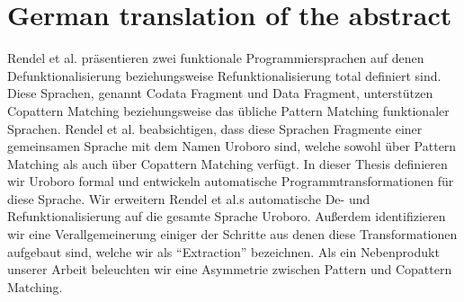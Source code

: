 \chapter{German translation of the abstract}

Rendel et al. präsentieren zwei funktionale Programmiersprachen auf denen Defunktionalisierung beziehungsweise Refunktionalisierung total definiert sind. Diese Sprachen, genannt Codata Fragment und Data Fragment, unterstützen Copattern Matching beziehungsweise das übliche Pattern Matching funktionaler Sprachen. Rendel et al. beabsichtigen, dass diese Sprachen Fragmente einer gemeinsamen Sprache mit dem Namen Uroboro sind, welche sowohl über Pattern Matching als auch über Copattern Matching verfügt. In dieser Thesis definieren wir Uroboro formal und entwickeln automatische Programmtransformationen für diese Sprache. Wir erweitern Rendel et al.s automatische De- und Refunktionalisierung auf die gesamte Sprache Uroboro. Außerdem identifizieren wir eine Verallgemeinerung einiger der Schritte aus denen diese Transformationen aufgebaut sind, welche wir als ``Extraction'' bezeichnen. Als ein Nebenprodukt unserer Arbeit beleuchten wir eine Asymmetrie zwischen Pattern und Copattern Matching.

